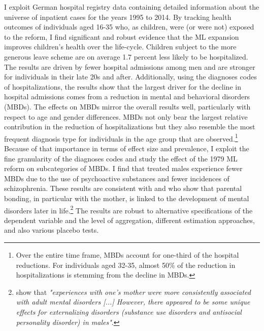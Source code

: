 I exploit German hospital registry data containing detailed information about the universe of inpatient cases for the years 1995 to 2014. By tracking health outcomes of individuals aged 16-35 who, as children, were (or were not) exposed to the reform, I find significant and robust evidence that the ML expansion improves children's health over the life-cycle. Children subject to the more generous leave scheme are on average 1.7 percent less likely to be hospitalized. The results are driven by fewer hospital admissions among men and are stronger for individuals in their late 20s and after. Additionally, using the diagnoses codes of hospitalizations, the results show that the largest driver for the decline in hospital admissions comes from a reduction in mental and behavioral disorders (MBDs). The effects on MBDs mirror the overall results well, particularly with respect to age and gender differences. MBDs not only bear the largest relative contribution in the reduction of hospitalizations but they also resemble the most frequent diagnosis type for individuals in the age group that are observed.\footnote{Over the entire time frame, MBDs account for one-third of the hospital reductions. For individuals aged 32-35, almost 50\% of the reduction in hospitalizations is stemming from the decline in MBDs.} Because of that importance in terms of effect size and prevalence, I exploit the fine granularity of the diagnoses codes and study the effect of the 1979 ML reform on subcategories of MBDs. I find that treated males experience fewer MBDs due to the use of psychoactive substances and fewer incidences of schizophrenia. These results are consistent with \cite{canetti1997parental} and \cite{enns_cox_clara_2002} who show that parental bonding, in particular with the mother, is linked to the development of mental disorders later in life.\footnote{\cite{enns_cox_clara_2002} show that \textit{"experiences with one's mother were more consistently associated with adult mental disorders [...] However, there appeared to be some unique effects for externalizing disorders (substance use disorders and antisocial personality disorder) in males"}.} The results are robust to alternative specifications of the dependent variable and the level of aggregation, different estimation approaches, and also various placebo tests. %



